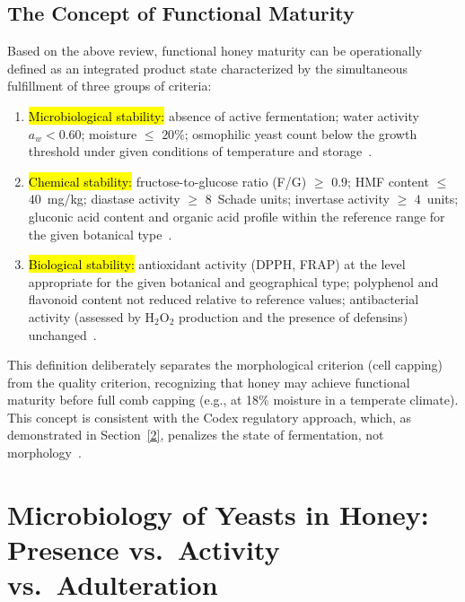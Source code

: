 \documentclass[foods,review,accept,pdftex,moreauthors]{Definitions/mdpi}
\begin{document}
{\subsection{The Concept of Functional Maturity}\label{3.3}
Based on the above review, functional honey maturity can be operationally defined as an integrated product state characterized by the simultaneous fulfillment of three groups of criteria:

\begin{enumerate}
    \item \hl{Microbiological stability:} %
    absence of active
          fermentation; water activity $a_w < 0.60$; moisture
          $\leq$ $20\%$; osmophilic yeast count below the growth
          threshold under given conditions of temperature
          and storage~\cite{zamora2006}.

    \item \hl{Chemical stability:} fructose-to-glucose ratio
          (F/G) $\geq$ $0.9$; HMF content $\leq$ $40$~mg/kg;
          diastase activity $\geq$ $8$~Schade units; invertase
          activity $\geq$ $4$~units; gluconic acid content and
          organic acid profile within the reference range
          for the given botanical type~\cite{codex_stan12,zhang2021}.

    \item \hl{Biological stability:} antioxidant activity
          (DPPH, FRAP) at the level appropriate for the given
          botanical and geographical type; polyphenol and flavonoid
          content not reduced relative to reference values;
          antibacterial activity (assessed by H$_2$O$_2$ production
          and the presence of defensins)
          unchanged~\cite{guo2020}.
\end{enumerate}

This definition deliberately separates the morphological criterion
(cell capping) from the quality criterion, recognizing that honey
may achieve functional maturity before full comb capping (e.g., at
18\% moisture in a temperate climate). This concept is consistent
with the Codex regulatory approach, which, as demonstrated in
Section~\ref{2}, penalizes the state of fermentation, not
morphology~\cite{codex_stan12,sun2021}.






\section{Microbiology of Yeasts in Honey:
Presence vs.\ Activity vs.\ Adulteration}\label{4}

}
\end{document}
